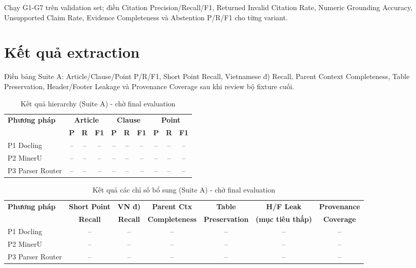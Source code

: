 \documentclass[a4paper,12pt]{extreport}
\newif\ifdraftmode
\newcommand{\pendingresult}[1]{%
  \ifdraftmode
  \begin{center}
  \fcolorbox{DraftBorder}{DraftYellow}{%
    \parbox{0.90\textwidth}{\textbf{Nội dung chờ cập nhật:} #1}
  }
  \end{center}
  \else
  #1
  \fi
}
\begin{document}
\pendingresult{Chạy G1-G7 trên validation set; điền Citation Precision/Recall/F1, Returned Invalid Citation Rate, Numeric Grounding Accuracy, Unsupported Claim Rate, Evidence Completeness và Abstention P/R/F1 cho từng variant.}

\section{Kết quả extraction}

\pendingresult{Điền bảng Suite A: Article/Clause/Point P/R/F1, Short Point Recall, Vietnamese đ) Recall, Parent Context Completeness, Table Preservation, Header/Footer Leakage và Provenance Coverage sau khi review bộ fixture cuối.}

\begin{table}[H]
\caption{Kết quả hierarchy (Suite A) - chờ final evaluation}
\small
\begin{tabularx}{\textwidth}{X c c c c c c c c c}
\toprule
\multirow{2}{*}{\textbf{Phương pháp}} & \multicolumn{3}{c}{\textbf{Article}} & \multicolumn{3}{c}{\textbf{Clause}} & \multicolumn{3}{c}{\textbf{Point}}\\
\cmidrule(lr){2-4}\cmidrule(lr){5-7}\cmidrule(lr){8-10}
 & \textbf{P} & \textbf{R} & \textbf{F1} & \textbf{P} & \textbf{R} & \textbf{F1} & \textbf{P} & \textbf{R} & \textbf{F1}\\
\midrule
P1 Docling & -- & -- & -- & -- & -- & -- & -- & -- & --\\
P2 MinerU & -- & -- & -- & -- & -- & -- & -- & -- & --\\
P3 Parser Router & -- & -- & -- & -- & -- & -- & -- & -- & --\\
\bottomrule
\end{tabularx}
\end{table}

\begin{table}[H]
\caption{Kết quả các chỉ số bổ sung (Suite A) - chờ final evaluation}
\small
\begin{tabularx}{\textwidth}{X c c c c c c}
\toprule
\textbf{Phương pháp} & \textbf{Short Point} & \textbf{VN đ)} & \textbf{Parent Ctx} & \textbf{Table} & \textbf{H/F Leak} & \textbf{Provenance}\\
 & \textbf{Recall} & \textbf{Recall} & \textbf{Completeness} & \textbf{Preservation} & \textbf{(mục tiêu thấp)} & \textbf{Coverage}\\
\midrule
P1 Docling & -- & -- & -- & -- & -- & --\\
P2 MinerU & -- & -- & -- & -- & -- & --\\
P3 Parser Router & -- & -- & -- & -- & -- & --\\
\bottomrule
\end{tabularx}
\end{table}
\end{document}
